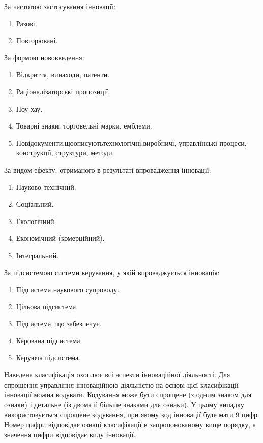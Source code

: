 За частотою застосування інновації:

\begin{enumerate}
	\item Разові.
	\item Повторювані.
\end{enumerate}

За формою нововведення:

\begin{enumerate}
	\item Відкриття, винаходи, патенти.
	\item Раціоналізаторські пропозиції.
	\item Ноу-хау.
	\item Товарні знаки, торговельні марки, емблеми.
	\item Нові\hfill документи,\hfill що\hfill описують\hfill технологічні,\hfill виробничі,\newline \hspace*{-18mm} управлінські процеси, конструкції, структури, методи.
\end{enumerate}

За видом ефекту, отриманого в результаті впровадження інновації:

\begin{enumerate}
	\item Науково-технічний.
	\item Соціальний.
	\item Екологічний.
	\item Економічний (комерційний).
	\item Інтегральний.
\end{enumerate}

За підсистемою системи керування, у якій впроваджується інновація:

\begin{enumerate}
	\item Підсистема наукового супроводу.
	\item Цільова підсистема.
	\item Підсистема, що забезпечує.
	\item Керована підсистема.
	\item Керуюча підсистема.
\end{enumerate}

Наведена класифікація охоплює всі аспекти інноваційної діяльності. Для спрощення управління інноваційною діяльністю на основі цієї класифікації інновації можна кодувати. Кодування може бути спрощене (з одним знаком для ознаки) і детальне (із двома й більше знаками для ознаки). У цьому випадку використовується спрощене кодування, при якому код інновації буде мати 9 цифр. Номер цифри відповідає ознаці класифікації в запропонованому вище порядку, а значення цифри відповідає виду інновації.

